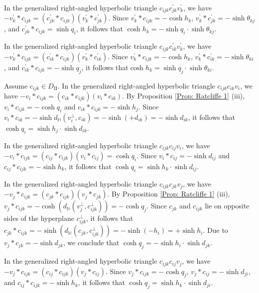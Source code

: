 \documentclass[12pt]{amsart}
\theoremstyle{definition}
\begin{document}
\begin{description}
In the generalized right-angled hyperbolic triangle $c_{ijk}c^\prime_{jk}v^\prime_k$,
we have $-v^\prime_k\ast c_{ijk}=(c^\prime_{jk}\ast c_{ijk})(v^\prime_k\ast c^\prime_{jk})$.
Since $v^\prime_k\ast c_{ijk}=-\cosh h_k$,
$v^\prime_k\ast c^\prime_{jk}=-\sinh \theta_{kj}$, and
$c^\prime_{jk}\ast c_{ijk}=\sinh q_i$,
it follows that $\cosh h_k=-\sinh q_i\cdot\sinh \theta_{kj}$.

In the generalized right-angled hyperbolic triangle $c_{ijk}c^\prime_{ik}v^\prime_k$,
we have $-v^\prime_k\ast c_{ijk}=(c^\prime_{ik}\ast c_{ijk})(v^\prime_k\ast c^\prime_{ik})$.
Since $v^\prime_k\ast c_{ijk}=-\cosh h_k$,
$v^\prime_k\ast c^\prime_{ik}=-\sinh \theta_{ki}$, and
$c^\prime_{ik}\ast c_{ijk}=-\sinh q_j$,
it follows that$\cosh h_k=\sinh q_j\cdot\sinh \theta_{ki}$.

\item[(2)] Assume $c_{ijk}\in D_\mathrm{II}$.
In the generalized right-angled hyperbolic triangle $c_{ijk}c_{ik}v_i$,
we have $-v_i\ast c_{ijk}=(c_{ik}\ast c_{ijk})(v_i\ast c_{ik})$.
By Proposition \ref{Prop: Ratcliffe 1} (iii), $v_i\ast c_{ijk}=-\cosh q_i$ and $c_{ik}\ast c_{ijk}=-\sinh h_j$.
Since $v_i\ast c_{ik}=-\sinh d_\mathbb{H}(v_i^\bot,c_{ik})=-\sinh(+d_{ik})=-\sinh d_{ik}$,
it follows that $\cosh q_i=\sinh h_j\cdot\sinh d_{ik}$.

In the generalized right-angled hyperbolic triangle $c_{ijk}c_{ij}v_i$,
we have $-v_i\ast c_{ijk}=(c_{ij}\ast c_{ijk})(v_i\ast c_{ij})=\cosh q_i$.
Since $v_i\ast c_{ij}=-\sinh d_{ij}$ and
$c_{ij}\ast c_{ijk}=-\sinh h_k$,
it follows that $\cosh q_i=\sinh h_k\cdot\sinh d_{ij}$.

In the generalized right-angled hyperbolic triangle $c_{ijk}c_{jk}v_j$,
we have $-v_j\ast c_{ijk}=(c_{jk}\ast c_{ijk})(v_j\ast c_{jk})$.
By Proposition \ref{Prop: Ratcliffe 1} (iii),
$v_j\ast c_{ijk}
=-\cosh(d_\mathbb{H}(v_j^\bot,c_{ijk}^\bot))
=-\cosh q_j$.
Since $c_{jk}$ and $c_{ijk}$ lie on opposite sides of the hyperplane $c_{ijk}^\bot$, 
it follows that $c_{jk}\ast c_{ijk}=-\sinh(d_\mathbb{H}(c_{jk},c_{ijk}^\bot))
=-\sinh (-h_i)=+\sinh h_i$.
Due to $v_j\ast c_{jk}=-\sinh d_{jk}$,
we conclude that $\cosh q_j=-\sinh h_i\cdot \sinh d_{jk}$.

In the generalized right-angled hyperbolic triangle $c_{ijk}c_{ij}v_j$,
we have $-v_j\ast c_{ijk}=(c_{ij}\ast c_{ijk})(v_j\ast c_{ij})$.
Since $v_j\ast c_{ijk}=-\cosh q_j$,
$v_j\ast c_{ij}=-\sinh d_{ji}$,
and $c_{ij}\ast c_{ijk}=-\sinh h_k$,
it follows that $\cosh q_j=\sinh h_k\cdot \sinh d_{ji}$.


\end{description}
\end{document}
